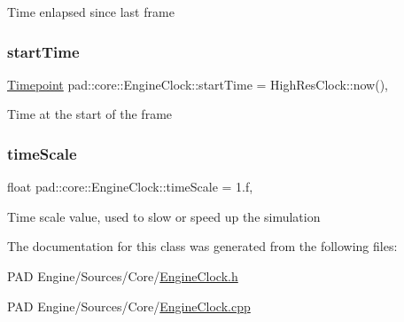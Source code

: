 Time enlapsed since last frame \mbox{\label{classpad_1_1core_1_1_engine_clock_a80732fd3767d4fdf18bac6d81fdf7e63}} 
\subsubsection{\texorpdfstring{start\+Time}{startTime}}
{\footnotesize\ttfamily \mbox{\hyperlink{namespacepad_1_1core_a4359864da05f393ed6e69d9d018946ad}{Timepoint}} pad\+::core\+::\+Engine\+Clock\+::start\+Time = High\+Res\+Clock\+::now()\hspace{0.3cm}{\ttfamily [static]}, {\ttfamily [private]}}

Time at the start of the frame \mbox{\label{classpad_1_1core_1_1_engine_clock_afb71f5ea4e8788c7b8d95a798347f642}} 
\subsubsection{\texorpdfstring{time\+Scale}{timeScale}}
{\footnotesize\ttfamily float pad\+::core\+::\+Engine\+Clock\+::time\+Scale = 1.f\hspace{0.3cm}{\ttfamily [static]}, {\ttfamily [private]}}

Time scale value, used to slow or speed up the simulation 

The documentation for this class was generated from the following files\+:\begin{DoxyCompactItemize}
\item 
P\+A\+D Engine/\+Sources/\+Core/\mbox{\hyperlink{_engine_clock_8h}{Engine\+Clock.\+h}}\item 
P\+A\+D Engine/\+Sources/\+Core/\mbox{\hyperlink{_engine_clock_8cpp}{Engine\+Clock.\+cpp}}\end{DoxyCompactItemize}
